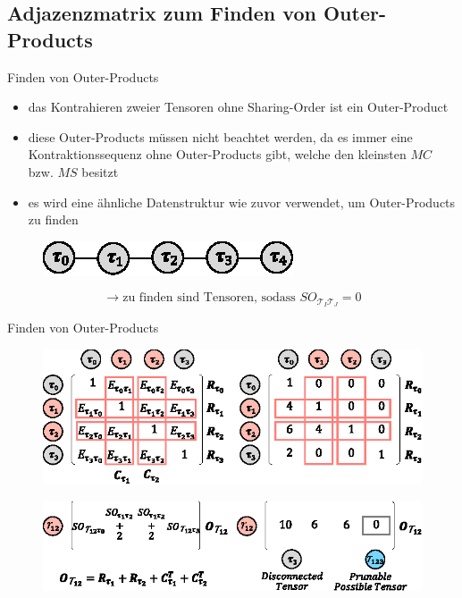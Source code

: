 \documentclass{beamer}
\newcommand{\Tau}{\bm{\mathcal{T}}}
\begin{document}
\subsection{Adjazenzmatrix zum Finden von Outer-Products}
\begin{frame}{Finden von Outer-Products}
	\begin{itemize}
		\item das Kontrahieren zweier Tensoren ohne Sharing-Order ist ein Outer-Product
		\item diese Outer-Products müssen nicht beachtet werden, da es immer eine Kontraktionssequenz ohne Outer-Products gibt, welche den kleinsten $MC$ bzw. $MS$ besitzt\cite{outerProduct}
		\item es wird eine ähnliche Datenstruktur wie zuvor verwendet, um Outer-Products zu finden
	\end{itemize}
	\begin{figure}
		\includegraphics{figure_06_a}
	\end{figure} \pause
	\begin{equation*}
		\rightarrow \text{zu finden sind Tensoren, sodass } SO_{\Tau_I \Tau_J} = 0
	\end{equation*}
\end{frame}

\begin{frame}{Finden von Outer-Products}
	\begin{figure}
		\includegraphics[scale=1.1]{figure_05_e_g}
	\end{figure} \pause
	\begin{figure}
		\includegraphics[scale=1.2]{figure_05_f_h}
	\end{figure}
\end{frame}
\end{document}
